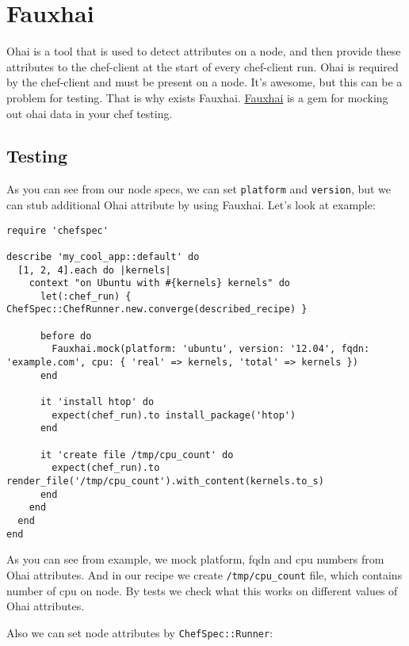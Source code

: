 \section{Fauxhai}
\label{sec:testing-fauxhai}

Ohai is a tool that is used to detect attributes on a node, and then provide these attributes to the chef-client at the start of every chef-client run. Ohai is required by the chef-client and must be present on a node. It's awesome, but this can be a problem for testing. That is why exists Fauxhai. \href{http://technology.customink.com/fauxhai/}{Fauxhai} is a gem for mocking out ohai data in your chef testing.

\subsection{Testing}

As you can see from our node specs, we can set \lstinline!platform! and \lstinline!version!, but we can stub additional Ohai attribute by using Fauxhai. Let's look at example:

\begin{lstlisting}[label=lst:testing-fauxhai1]
require 'chefspec'

describe 'my_cool_app::default' do
  [1, 2, 4].each do |kernels|
    context "on Ubuntu with #{kernels} kernels" do
      let(:chef_run) { ChefSpec::ChefRunner.new.converge(described_recipe) }

      before do
        Fauxhai.mock(platform: 'ubuntu', version: '12.04', fqdn: 'example.com', cpu: { 'real' => kernels, 'total' => kernels })
      end

      it 'install htop' do
        expect(chef_run).to install_package('htop')
      end

      it 'create file /tmp/cpu_count' do
        expect(chef_run).to render_file('/tmp/cpu_count').with_content(kernels.to_s)
      end
    end
  end
end
\end{lstlisting}

As you can see from example, we mock platform, fqdn and cpu numbers from Ohai attributes. And in our recipe we create \lstinline!/tmp/cpu_count! file, which contains number of cpu on node. By tests we check what this works on different values of Ohai attributes.

Also we can set node attributes by \lstinline!ChefSpec::Runner!:

